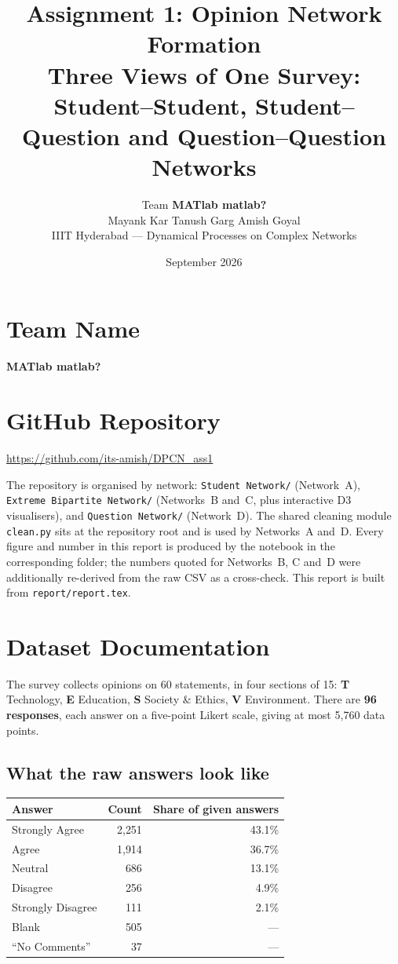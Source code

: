 \documentclass[11pt, a4paper]{article}
\title{\textbf{Assignment 1: Opinion Network Formation}\\[0.3em]
\large Three Views of One Survey: Student--Student, Student--Question and Question--Question Networks}
\author{Team \textbf{MATlab matlab?}\\[0.4em] Mayank Kar \quad Tanush Garg \quad Amish Goyal\\ IIIT Hyderabad --- Dynamical Processes on Complex Networks}
\date{September 2026}
\begin{document}
\maketitle

\section{Team Name}
\textbf{MATlab matlab?}

\section{GitHub Repository}
\url{https://github.com/its-amish/DPCN_ass1}

The repository is organised by network: \texttt{Student Network/} (Network~A), \texttt{Extreme Bipartite
Network/} (Networks~B and~C, plus interactive D3 visualisers), and \texttt{Question Network/} (Network~D). The
shared cleaning module \texttt{clean.py} sits at the repository root and is used by Networks~A and~D. Every
figure and number in this report is produced by the notebook in the corresponding folder; the numbers quoted for
Networks~B, C and~D were additionally re-derived from the raw CSV as a cross-check. This report is built from
\texttt{report/report.tex}.

\section{Dataset Documentation}

The survey collects opinions on 60 statements, in four sections of 15: \textbf{T} Technology, \textbf{E} Education,
\textbf{S} Society \& Ethics, \textbf{V} Environment. There are \textbf{96 responses}, each answer on a five-point
Likert scale, giving at most 5{,}760 data points.

\subsection{What the raw answers look like}

\begin{center}
\begin{tabular}{lrr}
\toprule
\textbf{Answer} & \textbf{Count} & \textbf{Share of given answers} \\
\midrule
Strongly Agree & 2{,}251 & 43.1\% \\
Agree & 1{,}914 & 36.7\% \\
Neutral & 686 & 13.1\% \\
Disagree & 256 & 4.9\% \\
Strongly Disagree & 111 & 2.1\% \\
\midrule
Blank & 505 & --- \\
``No Comments'' & 37 & --- \\
\bottomrule
\end{tabular}
\end{center}
\end{document}
